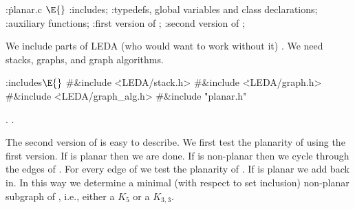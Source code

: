 
\Y\B\4:\.{planar.c }\X${}\E{}$\6
:includes\X;\6
:typedefs, global variables and class declarations\X;\6
:auxiliary functions\X;\6
:first version of \X;\6
:second version of \X;\par
\fi

We include parts of LEDA (who would want to
work without it) \cite{LEDA-Manual,Mehlhorn-Naeher:LEDA}.
We need stacks, graphs, and graph algorithms.

\Y\B\4:includes\X${}\E{}$\6
\8\#\&{include} \.{<LEDA/stack.h>}\6
\8\#\&{include} \.{<LEDA/graph.h>}\6
\8\#\&{include} \.{<LEDA/graph\_alg.h>}\6
\8\#\&{include} \.{"planar.h"}\par
{}.
.\fi

The second version of  is easy to describe. We first test
the
planarity of  using the first version.
If  is planar then we are done. If  is
non-planar then we cycle through the edges of . For every edge 
of
 we test the planarity of . If  is planar
we add  back in.
In this way we determine a minimal (with respect to set inclusion)
non-planar subgraph of , i.e., either a $K_5$ or a $K_{3,3}$.

